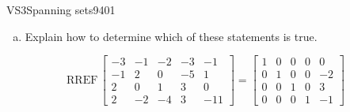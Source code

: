 \begin{exercise}{VS3}{Spanning sets}{9401}
\begin{exerciseStatement}
\begin{enumerate}[(a)]
\begin{itemize}
 The set of vectors \(\left\{ \left[\begin{array}{c}
-3 \\
-1 \\
2 \\
2
\end{array}\right] , \left[\begin{array}{c}
-1 \\
2 \\
0 \\
-2
\end{array}\right] , \left[\begin{array}{c}
-2 \\
0 \\
1 \\
-4
\end{array}\right] , \left[\begin{array}{c}
-3 \\
-5 \\
3 \\
3
\end{array}\right] , \left[\begin{array}{c}
-1 \\
1 \\
0 \\
-11
\end{array}\right] \right\}\) does \textbf{not} span \(\mathbb R^4\). 

 
\end{itemize}

     
\item  

 Explain how to determine which of these statements is true. 

 
\end{enumerate}

     \end{exerciseStatement}
 \begin{exerciseAnswer} 

 \[
\mathrm{RREF}\, \left[\begin{array}{ccccc}
-3 & -1 & -2 & -3 & -1 \\
-1 & 2 & 0 & -5 & 1 \\
2 & 0 & 1 & 3 & 0 \\
2 & -2 & -4 & 3 & -11
\end{array}\right] = \left[\begin{array}{ccccc}
1 & 0 & 0 & 0 & 0 \\
0 & 1 & 0 & 0 & -2 \\
0 & 0 & 1 & 0 & 3 \\
0 & 0 & 0 & 1 & -1
\end{array}\right]
            \] 


\end{exerciseAnswer}
\end{exercise}
